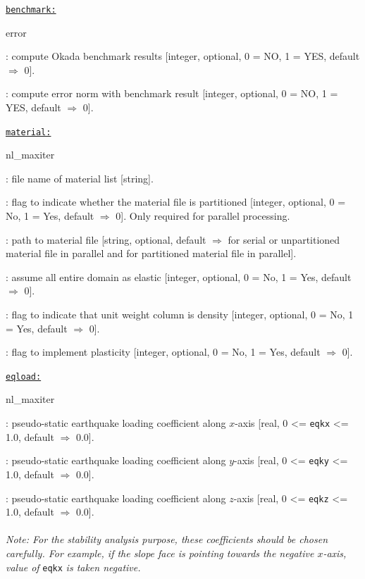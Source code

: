 \texttt{\underline{benchmark:}}
\begin{adescription}{error}
  \item[okada]: compute Okada benchmark results [integer, optional, 0 = NO, 1 = YES, default $\Rightarrow$ 0].
  \item[error]: compute error norm with benchmark result [integer, optional, 0 = NO, 1 = YES, default $\Rightarrow$ 0].
  \\
\end{adescription}

\texttt{\underline{material:}}
\begin{adescription}{nl\_maxiter}
  \item[matfile]: file name of material list [string].
  \item[ispart]: flag to indicate whether the material file is partitioned [integer, optional, 0 = No, 1 = Yes, default $\Rightarrow$ 0]. Only required for parallel processing.
  \item[matpath]: path to material file [string, optional, default $\Rightarrow$ \texttt{} for serial or unpartitioned material file in parallel and \texttt{} for partitioned material file in parallel].
  \item[allelastic]: assume all entire domain as elastic [integer, optional, 0 = No, 1 = Yes, default $\Rightarrow$ 0].
  \item[density]: flag to indicate that unit weight column is density [integer, optional, 0 = No, 1 = Yes, default $\Rightarrow$ 0].
  \item[plastic]: flag to implement plasticity [integer, optional, 0 = No, 1 = Yes, default $\Rightarrow$ 0].
  \\
\end{adescription}

\texttt{\underline{eqload:}}
\begin{adescription}{nl\_maxiter}
  \item[eqkx]: pseudo-static earthquake loading coefficient along $x$-axis [real, 0 <= \texttt{eqkx} <= 1.0, default $\Rightarrow$ 0.0].
  \item[eqky]: pseudo-static earthquake loading coefficient along $y$-axis [real, 0 <= \texttt{eqky} <= 1.0, default $\Rightarrow$ 0.0].
  \item[eqkz]: pseudo-static earthquake loading coefficient along $z$-axis [real, 0 <= \texttt{eqkz} <= 1.0, default $\Rightarrow$ 0.0].
  \\\\
  {\emph{Note: For the stability analysis purpose, these coefficients should be chosen carefully. For example, if the slope face is pointing towards the negative $x$-axis, value of}} \texttt{eqkx} {\emph{is taken negative.}} \\
\end{adescription}

